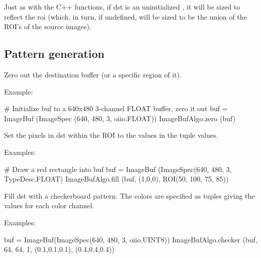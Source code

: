Just as with the C++ \IBA functions, if {\cf dst} is an uninitialized
\ImageBuf, it will be sized to reflect the {\cf roi} (which, in turn, if
undefined, will be sized to be the union of the ROI's of the source 
images).

\subsection{Pattern generation}
\label{sec:iba:py:patterns}

 

Zero out the destination buffer (or a specific region of it).

\smallskip
\noindent Example:
\begin{code}
    # Initialize buf to a 640x480 3-channel FLOAT buffer, zero it out
    buf = ImageBuf (ImageSpec (640, 480, 3, oiio.FLOAT))
    ImageBufAlgo.zero (buf)
\end{code}
\apiend

 

Set the pixels in {\cf dst} within the ROI to the
values in the tuple {\cf values}.

\smallskip
\noindent Examples:
\begin{code}
    # Draw a red rectangle into buf
    buf = ImageBuf (ImageSpec(640, 480, 3, TypeDesc.FLOAT)
    ImageBufAlgo.fill (buf, (1,0,0), ROI(50, 100, 75, 85))
\end{code}
\apiend


 

Fill {\cf dst} with a checkerboard pattern. The colors are specified as
tuples giving the values for each color channel.

\smallskip
\noindent Examples:
\begin{code}
    buf = ImageBuf(ImageSpec(640, 480, 3, oiio.UINT8))
    ImageBufAlgo.checker (buf, 64, 64, 1, (0.1,0.1,0.1), (0.4,0.4,0.4))
\end{code}
\apiend


 

